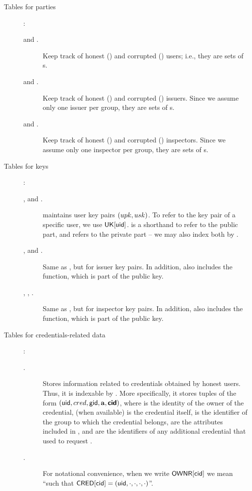 \begin{description}
\item[Tables for parties]:
  \begin{description}
  \item[\HU and \CU.] Keep track of honest (\HU) and corrupted (\CU) users;
    i.e., they are sets of {\uid}s.
  \item[\HI and \CI.] Keep track of honest (\HI) and corrupted (\CI) issuers.
    Since we assume only one issuer per group, they are sets of {\gid}s.
  \item[\HO and \CO.] Keep track of honest (\HO) and corrupted (\CO) inspectors.
    Since we assume only one inspector per group, they are sets of {\gid}s.
  \end{description}
\item[Tables for keys]:
  \begin{description}
  \item[\UK, \PUBUK and \PRVUK.] \UK maintains user key pairs $(upk,usk)$.
    To refer to the key pair of a specific user, we use $\mathsf{UK}[\mathsf{uid}]$. \PUBUK
    is a shorthand to refer to the public part, and \PRVUK refers to the
    private part -- we may also index both by \uid.
  \item[\IK, \PUBIK and \PRVIK.] Same as \UK, but for issuer key pairs. In
    addition, \IK also includes the \fissue function, which is part of the
    public key.
  \item[\OK, \PUBOK, \PRVOK.] Same as \UK, but for inspector key pairs. In
    addition, \OK also includes the \finsp function, which is part of the
    public key.
  \end{description}
\item[Tables for credentials-related data]:
  \begin{description}
  \item[\CRED.] Stores information related to credentials obtained by honest
    users. Thus, it is indexable by \cid. More specifically, it stores tuples of
    the form $(\mathsf{uid},cred,\mathsf{gid},\mathbf{a},\boldsymbol{\mathsf{cid}})$, where \uid is the identity of the
    owner of the credential, \cred (when available) is the credential itself,
    \gid is the identifier of the group to which the credential belongs, \attrs
    are the attributes included in \cred, and \scid are the identifiers of any
    additional credential that \uid used to request \cred.
  \item[\OWNR.] For notational convenience, when we write $\mathsf{OWNR}[\mathsf{cid}]$ we mean
    ``\uid such that $\mathsf{CRED}[\mathsf{cid}] = (\mathsf{uid}, \cdot, \cdot, \cdot, \cdot)$''.

\end{description}
\end{description}
